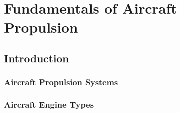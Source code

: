 \chapter{Fundamentals of Aircraft Propulsion}
\section{Introduction}
\subsection{Aircraft Propulsion Systems}
\subsection{Aircraft Engine Types}